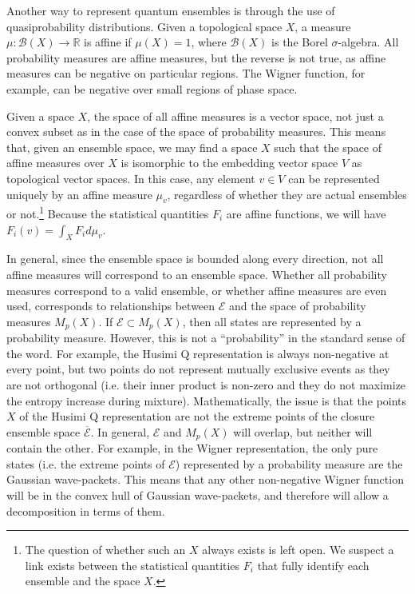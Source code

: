 \documentclass[10pt,twocolumn, nofootinbib]{revtex4-2}
\newcommand{\Ens}[1][E] {\mathcal{#1}} %
\begin{document}
Another way to represent quantum ensembles is through the use of quasiprobability distributions. Given a topological space $X$, a measure $\mu: \mathcal{B}(X) \to \mathbb{R}$ is affine if $\mu(X)=1$, where $\mathcal{B}(X)$ is the Borel $\sigma$-algebra. All probability measures are affine measures, but the reverse is not true, as affine measures can be negative on particular regions. The Wigner function, for example, can be negative over small regions of phase space.

Given a space $X$, the space of all affine measures is a vector space, not just a convex subset as in the case of the space of probability measures. This means that, given an ensemble space, we may find a space $X$ such that the space of affine measures over $X$ is isomorphic to the embedding vector space $V$ as topological vector spaces. In this case, any element $v\in V$ can be represented uniquely by an affine measure $\mu_{v}$, regardless of whether they are actual ensembles or not.\footnote{The question of whether such an $X$ always exists is left open. We suspect a link exists between the statistical quantities $F_i$ that fully identify each ensemble and the space $X$.} Because the statistical quantities $F_i$ are affine functions, we will have $F_i(v) = \int_X F_i d\mu_{v}$.

In general, since the ensemble space is bounded along every direction, not all affine measures will correspond to an ensemble space. Whether all probability measures correspond to a valid ensemble, or whether affine measures are even used, corresponds to relationships between $\Ens$ and the space of probability measures $M_p(X)$. If $\Ens \subset M_p(X)$, then all states are represented by a probability measure. However, this is not a ``probability'' in the standard sense of the word. For example, the Husimi Q representation is always non-negative at every point, but two points do not represent mutually exclusive events as they are not orthogonal (i.e. their inner product is non-zero and they do not maximize the entropy increase during mixture). Mathematically, the issue is that the points $X$ of the Husimi Q representation are not the extreme points of the closure ensemble space $\overline{\Ens}$. In general, $\Ens$ and $M_p(X)$ will overlap, but neither will contain the other. For example, in the Wigner representation, the only pure states (i.e. the extreme points of $\Ens$) represented by a probability measure are the Gaussian wave-packets. This means that any other non-negative Wigner function will be in the convex hull of Gaussian wave-packets, and therefore will allow a decomposition in terms of them.
\end{document}
